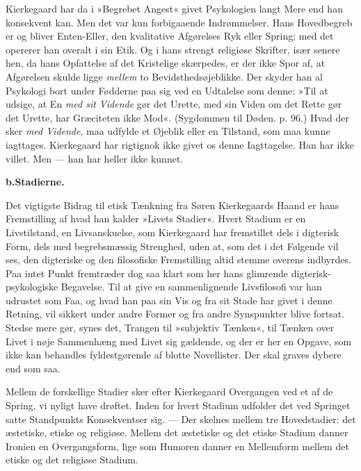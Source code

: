 \documentclass[12pt,a4paper,openany]{book}
\newcommand{\opage}[1]{\marginnote{\footnotesize\textit{[#1]}}}
\begin{document}
Kierkegaard har da i »Begrebet Angest« givet
Psykologien langt Mere end han konsekvent kan. Men
det var kun forbigaaende Indrømmelser. Hans Hovedbegreb
er og bliver Enten-Eller, den kvalitative Afgørelses
Ryk eller Spring; med det opererer han overalt i sin
\opage{82}Etik. Og i hans strengt religiøse Skrifter, især senere
hen, da hans Opfattelse af det Kristelige skærpedes, er
der ikke Spor af, at Afgørelsen skulde ligge \textit{mellem} to
Bevidsthedsøjeblikke. Der skyder han al Psykologi bort
under Fødderne paa sig ved en Udtalelse som denne:
»Til at udsige, at En \textit{med sit Vidende} gør det Urette,
med sin Viden om det Rette gør det Urette, har Græciteten
ikke Mod«. (Sygdommen til Døden. p. 96.) Hvad
der sker \textit{med Vidende}, maa udfylde et Øjeblik eller en
Tilstand, som maa kunne iagttages. Kierkegaard har
rigtignok ikke givet os denne Iagttagelse. Han har ikke
villet. Men --- han har heller ikke kunnet.

\begin{center}\textbf{b.\enspace Stadierne.}\end{center}

Det vigtigste Bidrag til etisk Tænkning fra Søren
Kierkegaards Haand er hans Fremstilling af hvad han
kalder »Livets Stadier«. Hvert Stadium er en Livstilstand,
en Livsanskuelse, som Kierkegaard har fremstillet
dels i digterisk Form, dels med begrebsmæssig Strenghed,
uden at, som det i det Følgende vil ses, den digteriske
og den filosofiske Fremstilling altid stemme overens
indbyrdes. Paa intet Punkt fremtræder dog saa
klart som her hans glimrende digterisk-psykologiske Begavelse.
Til at give en sammenlignende Livsfilosofi var
han udrustet som Faa, og hvad han paa sin Vis og fra
sit Stade har givet i denne Retning, vil sikkert under
andre Former og fra andre Synspunkter blive fortsat.
Stedse mere gør, synes det, Trangen til »subjektiv Tænken«,
til Tænken over Livet i nøje Sammenhæng med
Livet sig gældende, og der er her en Opgave, som ikke
kan behandles fyldestgørende af blotte Novellister. Der
skal graves dybere end som saa.

\opage{83}Mellem de forskellige Stadier sker efter Kierkegaard
Overgangen ved et af de Spring, vi nyligt have drøftet.
Inden for hvert Stadium udfolder det ved Springet satte
Standpunkts Konsekventser sig. --- Der skelnes mellem
tre Hovedstadier: det æstetiske, etiske og religiøse.
Mellem det æstetiske og det etiske Stadium danner Ironien
en Overgangsform, lige som Humoren danner en
Mellemform mellem det etiske og det religiøse Stadium.
\end{document}
